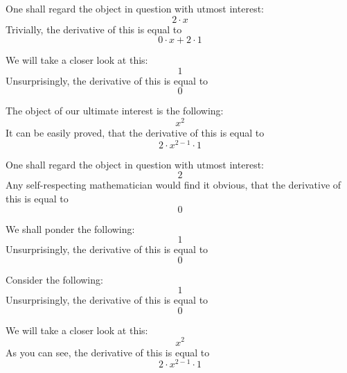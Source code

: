 \documentclass{article}
\begin{document}
One shall regard the object in question with utmost interest:
\begin{equation}
2 \cdot x 
\end{equation}
Trivially, the derivative of this is equal to
\begin{equation}
0 \cdot x + 2 \cdot 1 
\end{equation}

We will take a closer look at this:
\begin{equation}
1 
\end{equation}
Unsurprisingly, the derivative of this is equal to
\begin{equation}
0 
\end{equation}

The object of our ultimate interest is the following:
\begin{equation}
x ^{2 } 
\end{equation}
It can be easily proved, that the derivative of this is equal to
\begin{equation}
2 \cdot x ^{2 - 1 } \cdot 1 
\end{equation}

One shall regard the object in question with utmost interest:
\begin{equation}
2 
\end{equation}
Any self-respecting mathematician would find it obvious, that the derivative of this is equal to
\begin{equation}
0 
\end{equation}

We shall ponder the following:
\begin{equation}
1 
\end{equation}
Unsurprisingly, the derivative of this is equal to
\begin{equation}
0 
\end{equation}

Consider the following:
\begin{equation}
1 
\end{equation}
Unsurprisingly, the derivative of this is equal to
\begin{equation}
0 
\end{equation}

We will take a closer look at this:
\begin{equation}
x ^{2 } 
\end{equation}
As you can see, the derivative of this is equal to
\begin{equation}
2 \cdot x ^{2 - 1 } \cdot 1 
\end{equation}
\end{document}
